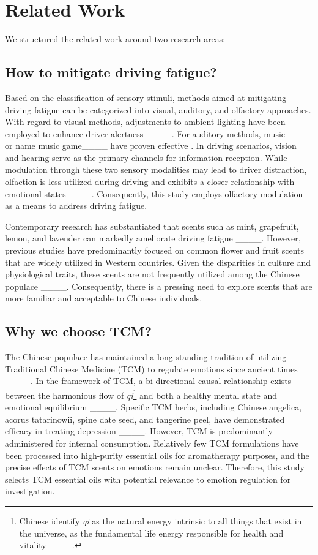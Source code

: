 \section{Related Work}
We structured the related work around two research areas:


\subsection{How to mitigate driving fatigue?}
Based on the classification of sensory stimuli, methods aimed at mitigating driving fatigue can be categorized into visual, auditory, and olfactory approaches. With regard to visual methods, adjustments to ambient lighting have been employed to enhance driver alertness ____. For auditory methods, music____ or name music game____ have proven effective . In driving scenarios, vision and hearing serve as the primary channels for information reception. While modulation through these two sensory modalities may lead to driver distraction, olfaction is less utilized during driving and exhibits a closer relationship with emotional states____. Consequently, this study employs olfactory modulation as a means to address driving fatigue.

Contemporary research has substantiated that scents such as mint, grapefruit, lemon, and lavender can markedly ameliorate driving fatigue ____. However, previous studies have predominantly focused on common flower and fruit scents that are widely utilized in Western countries. Given the disparities in culture and physiological traits, these scents are not frequently utilized among the Chinese populace ____. Consequently, there is a pressing need to explore scents that are more familiar and acceptable to Chinese individuals.

\subsection{Why we choose TCM?}
The Chinese populace has maintained a long-standing tradition of utilizing Traditional Chinese Medicine (TCM) to regulate emotions since ancient times ____. In the framework of TCM, a bi-directional causal relationship exists between the harmonious flow of \textit{qi}\footnote[1]{Chinese identify \textit{qi} as the natural energy intrinsic to all things that exist in the universe, as the fundamental life energy responsible for health and vitality____.} and both a healthy mental state and emotional equilibrium ____. Specific TCM herbs, including Chinese angelica, acorus tatarinowii, spine date seed, and tangerine peel, have demonstrated efficacy in treating depression ____.
However, TCM is predominantly administered for internal consumption. Relatively few TCM formulations have been processed into high-purity essential oils for aromatherapy purposes, and the precise effects of TCM scents on emotions remain unclear. Therefore, this study selects TCM essential oils with potential relevance to emotion regulation for investigation.